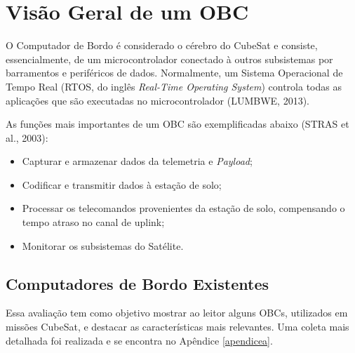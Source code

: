 \section{Visão Geral de um OBC}

O Computador de Bordo é considerado o cérebro do CubeSat e consiste, essencialmente, de um microcontrolador conectado à outros subsistemas por barramentos  e periféricos de dados. Normalmente, um Sistema Operacional de Tempo Real (RTOS, do inglês \textit{Real-Time Operating System}) controla todas as aplicações que são executadas no microcontrolador (LUMBWE, 2013).

As funções mais importantes de um OBC são exemplificadas abaixo (STRAS et al., 2003):

\begin{itemize}

\item Capturar e armazenar dados da telemetria e \textit{Payload};

\item Codificar e transmitir dados à estação de solo;

\item Processar os telecomandos provenientes da estação de solo, compensando o tempo atraso no canal de uplink;

\item Monitorar os subsistemas do Satélite.

\end{itemize}

\subsection{Computadores de Bordo Existentes}

Essa avaliação tem como objetivo mostrar ao leitor alguns OBCs, utilizados em missões CubeSat, e destacar as características mais relevantes. Uma coleta mais detalhada foi realizada e se encontra no Apêndice \ref{apendicea}.

